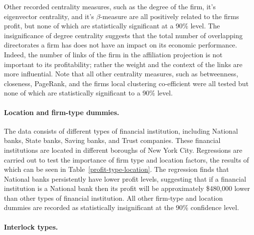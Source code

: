 \documentclass[11pt,fleqn]{article}
\begin{document}
Other recorded centrality measures, such as the degree of the firm, it's eigenvector centrality, and it's $\beta$-measure are all positively related to the firms profit, but none of which are statistically significant at a 90\% level. The insignificance of degree centrality suggests that the total number of overlapping directorates a firm has does not have an impact on its economic performance. Indeed, the number of links of the firm in the affiliation projection is not important to its profitability; rather the weight and the context of the links are more influential. Note that all other centrality measures, such as betweenness, closeness, PageRank, and the firms local clustering co-efficient were all tested but none of which are statistically significant to a 90\% level.

\paragraph{Location and firm-type dummies.}

The data consists of different types of financial institution, including National banks, State banks, Saving banks, and Trust companies. These financial institutions are located in different boroughs of New York City. Regressions are carried out to test the importance of firm type and location factors, the results of which can be seen in Table~\ref{profit-type-location}. The regression finds that National banks persistently have lower profit levels, suggesting that if a financial institution is a National bank then its profit will be approximately \$480,000 lower than other types of financial institution. All other firm-type and location dummies are recorded as statistically insignificant at the 90\% confidence level.

\paragraph{Interlock types.}
\end{document}
